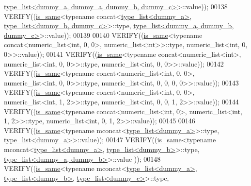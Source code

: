 \begin{DoxyCode}
      \hyperlink{struct_eigen_1_1internal_1_1type__list}{type\_list<dummy\_a, dummy\_a, dummy\_b, dummy\_c>}>::value));
00138   VERIFY((\hyperlink{struct_eigen_1_1internal_1_1is__same}{is\_same}<\textcolor{keyword}{typename} concat<\hyperlink{struct_eigen_1_1internal_1_1type__list}{type\_list<dummy\_a>}, 
      \hyperlink{struct_eigen_1_1internal_1_1type__list}{type\_list<dummy\_b, dummy\_c>}>::type, 
      \hyperlink{struct_eigen_1_1internal_1_1type__list}{type\_list<dummy\_a, dummy\_b, dummy\_c>}>::value));
00139 
00140   VERIFY((\hyperlink{struct_eigen_1_1internal_1_1is__same}{is\_same}<\textcolor{keyword}{typename} concat<numeric\_list<int, 0, 0>, numeric\_list<int>>::type, 
      numeric\_list<int, 0, 0>>::value));
00141   VERIFY((\hyperlink{struct_eigen_1_1internal_1_1is__same}{is\_same}<\textcolor{keyword}{typename} concat<numeric\_list<int>, numeric\_list<int, 0, 0>>::type, 
      numeric\_list<int, 0, 0>>::value));
00142   VERIFY((\hyperlink{struct_eigen_1_1internal_1_1is__same}{is\_same}<\textcolor{keyword}{typename} concat<numeric\_list<int, 0, 0>, numeric\_list<int, 0, 0>>::type, 
      numeric\_list<int, 0, 0, 0, 0>>::value));
00143   VERIFY((\hyperlink{struct_eigen_1_1internal_1_1is__same}{is\_same}<\textcolor{keyword}{typename} concat<numeric\_list<int, 0, 0>, numeric\_list<int, 1, 2>>::type, 
      numeric\_list<int, 0, 0, 1, 2>>::value));
00144   VERIFY((\hyperlink{struct_eigen_1_1internal_1_1is__same}{is\_same}<\textcolor{keyword}{typename} concat<numeric\_list<int, 0>, numeric\_list<int, 1, 2>>::type, 
      numeric\_list<int, 0, 1, 2>>::value));
00145 
00146   VERIFY((\hyperlink{struct_eigen_1_1internal_1_1is__same}{is\_same}<\textcolor{keyword}{typename} mconcat<\hyperlink{struct_eigen_1_1internal_1_1type__list}{type\_list<dummy\_a>}>::type, 
      \hyperlink{struct_eigen_1_1internal_1_1type__list}{type\_list<dummy\_a>}>::value));
00147   VERIFY((\hyperlink{struct_eigen_1_1internal_1_1is__same}{is\_same}<\textcolor{keyword}{typename} mconcat<\hyperlink{struct_eigen_1_1internal_1_1type__list}{type\_list<dummy\_a>}, 
      \hyperlink{struct_eigen_1_1internal_1_1type__list}{type\_list<dummy\_b>}>::type, \hyperlink{struct_eigen_1_1internal_1_1type__list}{type\_list<dummy\_a, dummy\_b>}>::value
      ));
00148   VERIFY((\hyperlink{struct_eigen_1_1internal_1_1is__same}{is\_same}<\textcolor{keyword}{typename} mconcat<\hyperlink{struct_eigen_1_1internal_1_1type__list}{type\_list<dummy\_a>}, 
      \hyperlink{struct_eigen_1_1internal_1_1type__list}{type\_list<dummy\_b>}, \hyperlink{struct_eigen_1_1internal_1_1type__list}{type\_list<dummy\_c>}>::type, 

\end{DoxyCode}
